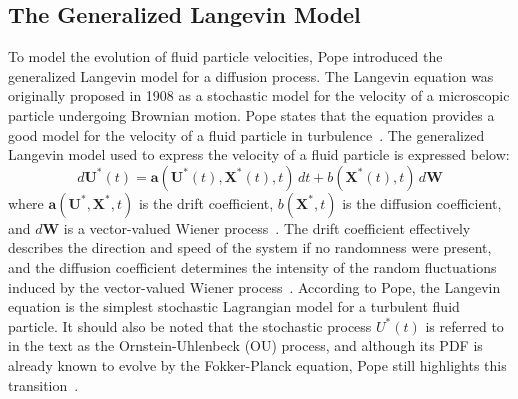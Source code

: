 \documentclass[12pt, onecolumn, journal]{IEEEtran}
\begin{document}
\subsection{The Generalized Langevin Model}
To model the evolution of fluid particle velocities, Pope introduced the generalized Langevin model for a diffusion process. The Langevin equation was originally proposed in 1908 as a stochastic model for the velocity of a microscopic particle undergoing Brownian motion. Pope states that the equation provides a good model for the velocity of a fluid particle in turbulence~\cite{Pope2000}. The generalized Langevin model used to express the velocity of a fluid particle is expressed below:
\begin{equation}
    d\mathbf{U^*}(t) = \mathbf{a}(\mathbf{U^*}(t), \mathbf{X^*}(t), t)\,dt + b(\mathbf{X^*}(t), t)\,d\mathbf{W}
    \label{eq:langevin}
\end{equation}
where $\mathbf{a}(\mathbf{U^*}, \mathbf{X^*}, t)$ is the drift coefficient, $b(\mathbf{X^*}, t)$ is the diffusion coefficient, and $d\mathbf{W}$ is a vector-valued Wiener process~\cite{Pope2000}. The drift coefficient effectively describes the direction and speed of the system if no randomness were present, and the diffusion coefficient determines the intensity of the random fluctuations induced by the vector-valued Wiener process~\cite{Pope2000}. According to Pope, the Langevin equation is the simplest stochastic Lagrangian model for a turbulent fluid particle. It should also be noted that the stochastic process $U^*(t)$ is referred to in the text as the Ornstein-Uhlenbeck (OU) process, and although its PDF is already known to evolve by the Fokker-Planck equation, Pope still highlights this transition~\cite{Pope2000}.
\end{document}
